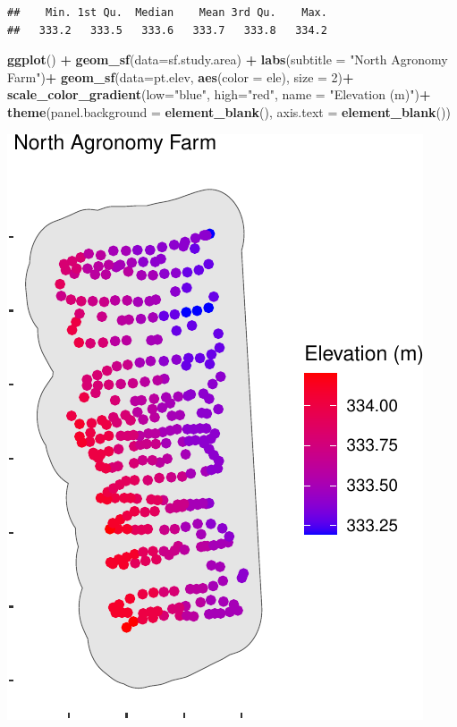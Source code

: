 \documentclass[
]{book}
\newenvironment{Shaded}{\begin{snugshade}}{\end{snugshade}}
\newcommand{\AttributeTok}[1]{\textcolor[rgb]{0.13,0.29,0.53}{#1}}
\newcommand{\DecValTok}[1]{\textcolor[rgb]{0.00,0.00,0.81}{#1}}
\newcommand{\FunctionTok}[1]{\textcolor[rgb]{0.13,0.29,0.53}{\textbf{#1}}}
\newcommand{\NormalTok}[1]{#1}
\newcommand{\SpecialCharTok}[1]{\textcolor[rgb]{0.81,0.36,0.00}{\textbf{#1}}}
\newcommand{\StringTok}[1]{\textcolor[rgb]{0.31,0.60,0.02}{#1}}
\begin{document}
\begin{verbatim}
##    Min. 1st Qu.  Median    Mean 3rd Qu.    Max. 
##   333.2   333.5   333.6   333.7   333.8   334.2
\end{verbatim}

\begin{Shaded}
\begin{Highlighting}[]
\FunctionTok{ggplot}\NormalTok{() }\SpecialCharTok{+}
  \FunctionTok{geom\_sf}\NormalTok{(}\AttributeTok{data=}\NormalTok{sf.study.area) }\SpecialCharTok{+}
  \FunctionTok{labs}\NormalTok{(}\AttributeTok{subtitle =} \StringTok{"North Agronomy Farm"}\NormalTok{)}\SpecialCharTok{+}
  \FunctionTok{geom\_sf}\NormalTok{(}\AttributeTok{data=}\NormalTok{pt.elev, }\FunctionTok{aes}\NormalTok{(}\AttributeTok{color =}\NormalTok{ ele), }\AttributeTok{size =} \DecValTok{2}\NormalTok{)}\SpecialCharTok{+}
  \FunctionTok{scale\_color\_gradient}\NormalTok{(}\AttributeTok{low=}\StringTok{"blue"}\NormalTok{, }\AttributeTok{high=}\StringTok{"red"}\NormalTok{, }\AttributeTok{name =} \StringTok{"Elevation (m)"}\NormalTok{)}\SpecialCharTok{+}
  \FunctionTok{theme}\NormalTok{(}\AttributeTok{panel.background =} \FunctionTok{element\_blank}\NormalTok{(),}
        \AttributeTok{axis.text =} \FunctionTok{element\_blank}\NormalTok{())}
\end{Highlighting}
\end{Shaded}

\includegraphics{_main_files/figure-latex/unnamed-chunk-15-3.pdf}
\end{document}
